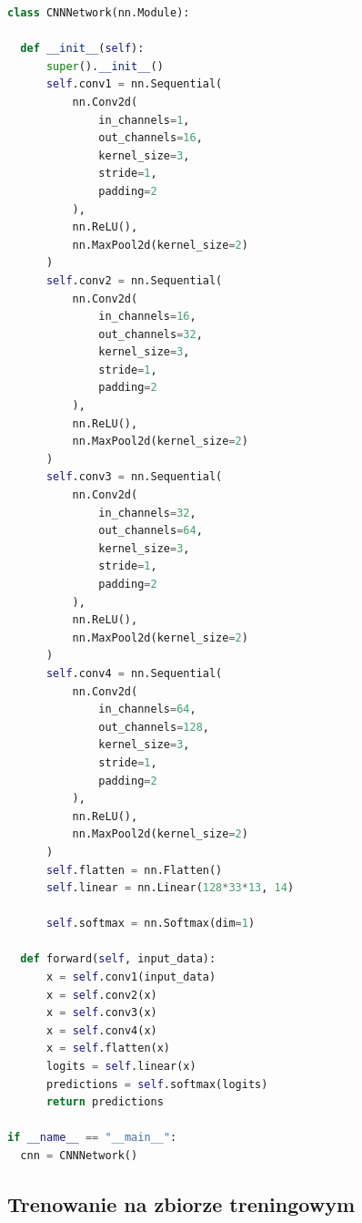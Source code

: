 \documentclass{sprz}
\begin{document}
\begin{lstlisting}[language=Python,caption={Implementacja sieci neuronowej}, label={lst:Sequelize_validate}]
  class CNNNetwork(nn.Module):

  def __init__(self):
      super().__init__()
      self.conv1 = nn.Sequential(
          nn.Conv2d(
              in_channels=1, 
              out_channels=16,  
              kernel_size=3,  
              stride=1,
              padding=2
          ),
          nn.ReLU(),
          nn.MaxPool2d(kernel_size=2)  
      )
      self.conv2 = nn.Sequential(
          nn.Conv2d(
              in_channels=16,
              out_channels=32,
              kernel_size=3,
              stride=1,
              padding=2
          ),
          nn.ReLU(),
          nn.MaxPool2d(kernel_size=2)
      )
      self.conv3 = nn.Sequential(
          nn.Conv2d(
              in_channels=32,
              out_channels=64,
              kernel_size=3,
              stride=1,
              padding=2
          ),
          nn.ReLU(),
          nn.MaxPool2d(kernel_size=2)
      )
      self.conv4 = nn.Sequential(
          nn.Conv2d(
              in_channels=64,
              out_channels=128,
              kernel_size=3,
              stride=1,
              padding=2
          ),
          nn.ReLU(),
          nn.MaxPool2d(kernel_size=2)
      )
      self.flatten = nn.Flatten()
      self.linear = nn.Linear(128*33*13, 14) 
                                             
      self.softmax = nn.Softmax(dim=1)

  def forward(self, input_data):
      x = self.conv1(input_data)
      x = self.conv2(x)
      x = self.conv3(x)
      x = self.conv4(x)
      x = self.flatten(x)
      logits = self.linear(x)
      predictions = self.softmax(logits)
      return predictions

if __name__ == "__main__":
  cnn = CNNNetwork()
\end{lstlisting}

\subsection{Trenowanie na zbiorze treningowym}
\end{document}
